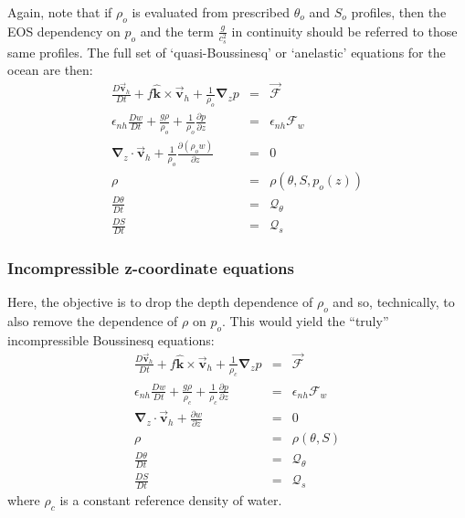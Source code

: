 \documentclass[12pt]{book}
\begin{document}
Again, note that if $\rho _{o}$ is evaluated from prescribed $\theta _{o}$
and $S_{o}$ profiles, then the EOS dependency on $p_{o}$ and the term $\frac{
g}{c_{s}^{2}}$ in continuity should be referred to those same profiles. The
full set of `quasi-Boussinesq' or `anelastic' equations for the ocean are
then: 
\begin{eqnarray}
\frac{D\vec{\mathbf{v}}_{h}}{Dt}+f\hat{\mathbf{k}}\times \vec{\mathbf{v}}
_{h}+\frac{1}{\rho _{o}}\mathbf{\nabla }_{z}p &=&\vec{\mathbf{\mathcal{F}}}
\label{eq-zab-hmom} \\
\epsilon _{nh}\frac{Dw}{Dt}+\frac{g\rho }{\rho _{o}}+\frac{1}{\rho _{o}}
\frac{\partial p}{\partial z} &=&\epsilon _{nh}\mathcal{F}_{w}
\label{eq-zab-hydro} \\
\mathbf{\nabla }_{z}\cdot \vec{\mathbf{v}}_{h}+\frac{1}{\rho _{o}}\frac{
\partial \left( \rho _{o}w\right) }{\partial z} &=&0  \label{eq-zab-cont} \\
\rho &=&\rho (\theta ,S,p_{o}(z))  \label{eq-zab-eos} \\
\frac{D\theta }{Dt} &=&\mathcal{Q}_{\theta }  \label{eq-zab-heat} \\
\frac{DS}{Dt} &=&\mathcal{Q}_{s}  \label{eq-zab-salt}
\end{eqnarray}

\subsubsection{Incompressible z-coordinate equations}

Here, the objective is to drop the depth dependence of $\rho _{o}$ and so,
technically, to also remove the dependence of $\rho $ on $p_{o}$. This would
yield the ``truly'' incompressible Boussinesq equations: 
\begin{eqnarray}
\frac{D\vec{\mathbf{v}}_{h}}{Dt}+f\hat{\mathbf{k}}\times \vec{\mathbf{v}}
_{h}+\frac{1}{\rho _{c}}\mathbf{\nabla }_{z}p &=&\vec{\mathbf{\mathcal{F}}}
\label{eq-ztb-hmom} \\
\epsilon _{nh}\frac{Dw}{Dt}+\frac{g\rho }{\rho _{c}}+\frac{1}{\rho _{c}}
\frac{\partial p}{\partial z} &=&\epsilon _{nh}\mathcal{F}_{w}
\label{eq-ztb-hydro} \\
\mathbf{\nabla }_{z}\cdot \vec{\mathbf{v}}_{h}+\frac{\partial w}{\partial z}
&=&0  \label{eq-ztb-cont} \\
\rho &=&\rho (\theta ,S)  \label{eq-ztb-eos} \\
\frac{D\theta }{Dt} &=&\mathcal{Q}_{\theta }  \label{eq-ztb-heat} \\
\frac{DS}{Dt} &=&\mathcal{Q}_{s}  \label{eq-ztb-salt}
\end{eqnarray}
where $\rho _{c}$ is a constant reference density of water.
\end{document}

